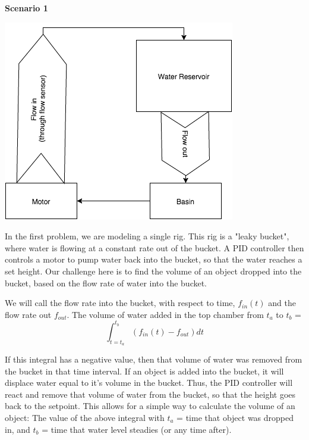 \documentclass[11pt]{article}
\begin{document}
\begin{center}
{\bfseries \Large Scenario 1}\\
\bigskip

\includegraphics[scale=0.75]{Problem1}
\end{center}
\bigskip
In the first problem, we are modeling a single rig. This rig is a "leaky bucket", where water is flowing
at a constant rate out of the bucket. A PID controller then controls a motor to pump water back into the 
bucket, so that the water reaches a set height. Our challenge here is to find the volume of an object
dropped into the bucket, based on the flow rate of water into the bucket.

We will call the flow rate into the bucket, with respect to time, $f_{in}(t)$ and
the flow rate out $f_{out}$.
The volume of water added in the top chamber from $t_a$ to $t_b$ =  
$$\int_{t=t_a}^{t_b}( f_{in}(t) - f_{out} ) dt$$

If this integral has a negative value, then that volume of water was removed from the bucket in that time interval.
If an object is added into the bucket, it will displace water equal to it's volume in the bucket. Thus, the PID controller
will react and remove that volume of water from the bucket, so that the height goes back to the setpoint.
This allows for a simple way to calculate the volume of an object: The value of the above integral with $t_a$
= time that object was dropped in, and $t_b$ = time that water level steadies (or any time after). 
\end{document}
